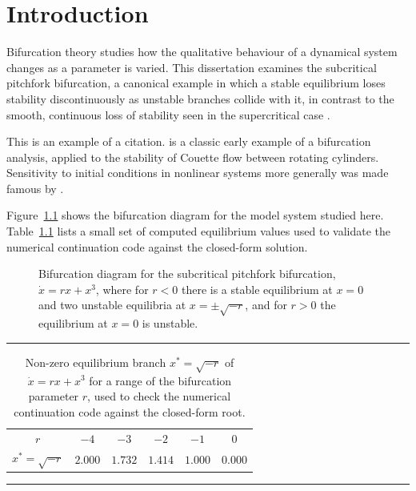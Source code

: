 \chapter{Introduction}

Bifurcation theory studies how the qualitative behaviour of a dynamical
system changes as a parameter is varied. This dissertation examines the
subcritical pitchfork bifurcation, a canonical example in which a stable
equilibrium loses stability discontinuously as unstable branches collide
with it, in contrast to the smooth, continuous loss of stability seen in
the supercritical case \citep{strogatz2015nonlinear}.

This is an example of a citation. \citet{taylor1923stability} is a classic
early example of a bifurcation analysis, applied to the stability of
Couette flow between rotating cylinders. Sensitivity to initial
conditions in nonlinear systems more generally was made famous by
\citet{lorenz1963deterministic}.

Figure~\ref{fig:subcritical_pitchfork_bifurcation} shows the bifurcation
diagram for the model system studied here. Table~\ref{tab:example} lists
a small set of computed equilibrium values used to validate the
numerical continuation code against the closed-form solution.

\begin{figure}[t]
\centering
\begin{subfigure}[b]{0.8\textwidth}
\centering
\resizebox{\linewidth}{!}{}
\end{subfigure}
\caption{Bifurcation diagram for the subcritical pitchfork bifurcation, $\dot{x} = rx + x^3$, where for $r < 0$ there is a stable equilibrium at $x = 0$ and two unstable equilibria at $x = \pm\sqrt{-r}$, and for $r > 0$ the equilibrium at $x = 0$ is unstable.}
\label{fig:subcritical_pitchfork_bifurcation}
\end{figure}

\begin{table}[hp]
\centering
\hrule \vspace{0.5em}
\begin{tabular}{cccccc}
$r$ & $-4$ & $-3$ & $-2$ & $-1$ & $0$ \\
$x^*=\sqrt{-r}$ & $2.000$ & $1.732$ & $1.414$ & $1.000$ & $0.000$ \\
\end{tabular}
\caption{Non-zero equilibrium branch $x^*=\sqrt{-r}$ of $\dot{x}=rx+x^3$ for a range of the bifurcation parameter $r$, used to check the numerical continuation code against the closed-form root.}
\vspace{0.5em} \hrule
\label{tab:example}
\end{table}

